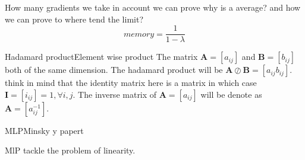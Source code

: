 \documentclass{beamer}
\begin{document}
\begin{frame}{How many gradients we take in account}
we can prove why is a average?
and how we can prove to where tend the limit?
\begin{equation}
memory = \frac{1}{1-\lambda}
\end{equation}



\end{frame}



\begin{frame}{Hadamard product}{Element wise product}
The matrix $\bm{A} = [a_{ij}]$ and $\bm{B} = [b_{ij}]$ both of the same dimension.  The hadamard product will be  $\bm{A} \oslash \bm{B} = [a_{ij}b_{ij}]$.
think in mind that the identity matrix here is a matrix in which case $\bm{I} = [i_{ij}]=1, \forall i,j$.
The inverse matrix of $\bm{A} = [a_{ij}]$ will be denote as $\bm{A} = [a_{ij}^{-1}]$. 
\end{frame}


\begin{frame}{MLP}{Minsky y papert}


\end{frame}


\begin{frame}{MlP}
tackle the problem of linearity.


\end{frame}
\end{document}
